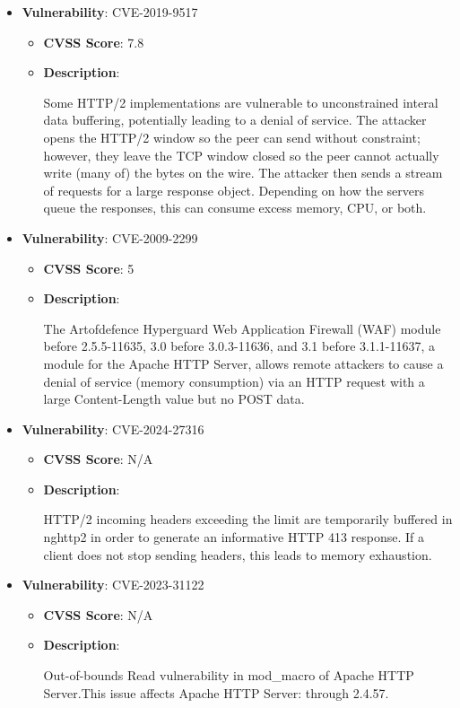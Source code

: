 \documentclass{article}
\begin{document}
\begin{itemize}
        \item \textbf{Vulnerability}: CVE-2019-9517
        \begin{itemize}
            \item \textbf{CVSS Score}:  7.8 
            \item \textbf{Description}:
            \parbox[t]{0.9\linewidth}{
                \ttfamily Some HTTP/2 implementations are vulnerable to unconstrained interal data buffering, potentially leading to a denial of service. The attacker opens the HTTP/2 window so the peer can send without constraint; however, they leave the TCP window closed so the peer cannot actually write (many of) the bytes on the wire. The attacker then sends a stream of requests for a large response object. Depending on how the servers queue the responses, this can consume excess memory, CPU, or both.
            }
        \end{itemize}
    
        \item \textbf{Vulnerability}: CVE-2009-2299
        \begin{itemize}
            \item \textbf{CVSS Score}:  5 
            \item \textbf{Description}:
            \parbox[t]{0.9\linewidth}{
                \ttfamily The Artofdefence Hyperguard Web Application Firewall (WAF) module before 2.5.5-11635, 3.0 before 3.0.3-11636, and 3.1 before 3.1.1-11637, a module for the Apache HTTP Server, allows remote attackers to cause a denial of service (memory consumption) via an HTTP request with a large Content-Length value but no POST data.
            }
        \end{itemize}
    
        \item \textbf{Vulnerability}: CVE-2024-27316
        \begin{itemize}
            \item \textbf{CVSS Score}:  N/A 
            \item \textbf{Description}:
            \parbox[t]{0.9\linewidth}{
                \ttfamily HTTP/2 incoming headers exceeding the limit are temporarily buffered in nghttp2 in order to generate an informative HTTP 413 response. If a client does not stop sending headers, this leads to memory exhaustion.
            }
        \end{itemize}
    
        \item \textbf{Vulnerability}: CVE-2023-31122
        \begin{itemize}
            \item \textbf{CVSS Score}:  N/A 
            \item \textbf{Description}:
            \parbox[t]{0.9\linewidth}{
                \ttfamily Out-of-bounds Read vulnerability in mod\_macro of Apache HTTP Server.This issue affects Apache HTTP Server: through 2.4.57.
            }
        \end{itemize}
    

\end{itemize}
\end{document}
